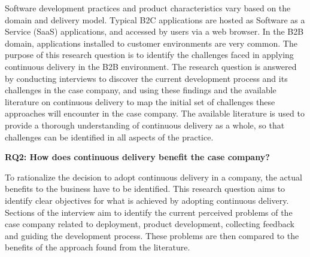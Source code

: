 \documentclass[lnbip]{svmultln}
\begin{document}
\noindent Software development practices and product characteristics vary based on the domain and delivery model. Typical B2C applications are hosted as Software as a Service (SaaS) applications, and accessed by users via a web browser. In the B2B domain, applications installed to customer environments are very common. The purpose of this research question is to identify the challenges faced in applying continuous delivery in the B2B environment. The research question is answered by conducting interviews to discover the current development process and its challenges in the case company, and using these findings and the available literature on continuous delivery to map the initial set of challenges these approaches will encounter in the case company. The available literature is used to provide a thorough understanding of continuous delivery as a whole, so that challenges can be identified in all aspects of the practice.
\newline




\noindent \textbf{RQ2: How does continuous delivery benefit the case company?} %

\noindent To rationalize the decision to adopt continuous delivery in a company, the actual benefits to the business have to be identified. This research question aims to identify clear objectives for what is achieved by adopting continuous delivery. Sections of the interview aim to identify the current perceived problems of the case company related to deployment, product development, collecting feedback and guiding the development process. These problems are then compared to the benefits of the approach found from the literature.
\end{document}
